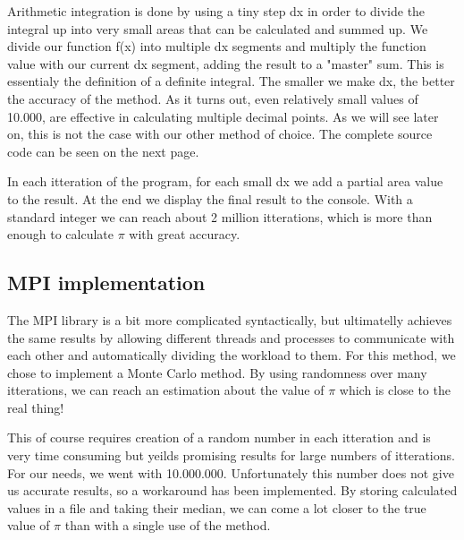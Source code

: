 \documentclass{article}
\begin{document}
Arithmetic integration is done by using a tiny step dx in order to divide the integral up into very small areas that can be calculated and summed up. We divide our function f(x) into multiple dx segments and multiply the function value with our current dx segment, adding the result to a "master" sum.
This is essentialy the definition of a definite integral. The smaller we make dx, the better the accuracy of the method. As it turns out, even relatively small values of 10.000, are effective in calculating multiple decimal points. As we will see later on, this is not the case with our other method of choice. The complete source code can be seen on the next page.

In each itteration of the program, for each small dx we add a partial area value to the result. At the end we display the final result to the console. With a standard integer we can reach about 2 million itterations, which is more than enough to calculate $ \pi $ with great accuracy.

\newpage



\subsection{MPI implementation}

The MPI library is a bit more complicated syntactically, but ultimatelly achieves the same results by allowing different threads and processes to communicate with each other and automatically dividing the workload to them.
For this method, we chose to implement a Monte Carlo method. By using randomness over many itterations, we can reach an estimation about the value of $ \pi $ which is close to the real thing!

This of course requires creation of a random number in each itteration and is very time consuming but yeilds promising results for large numbers of itterations.
For our needs, we went with 10.000.000. Unfortunately this number does not give us accurate results, so a workaround has been implemented.
By storing calculated values in a file and taking their median, we can come a lot closer to the true value of $ \pi $ than with a single use of the method.
\end{document}
